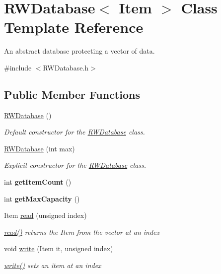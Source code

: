 \hypertarget{class_r_w_database}{}\section{R\+W\+Database$<$ Item $>$ Class Template Reference}
\label{class_r_w_database}


An abstract database protecting a vector of data.  




{\ttfamily \#include $<$R\+W\+Database.\+h$>$}

\subsection*{Public Member Functions}
\begin{DoxyCompactItemize}
\item 
\hyperlink{class_r_w_database_ab6e78a49fcfe2e296b7d7695c1404dd5}{R\+W\+Database} ()
\begin{DoxyCompactList}\small\item\em Default constructor for the \hyperlink{class_r_w_database}{R\+W\+Database} class. \end{DoxyCompactList}\item 
\hyperlink{class_r_w_database_aed3ea810bc64b4fcb41a8660b3a583de}{R\+W\+Database} (int max)
\begin{DoxyCompactList}\small\item\em Explicit constructor for the \hyperlink{class_r_w_database}{R\+W\+Database} class. \end{DoxyCompactList}\item 
\mbox{\label{class_r_w_database_aa09d7c17e7741dcb480f052ff3689299}} 
int {\bfseries get\+Item\+Count} ()
\item 
\mbox{\label{class_r_w_database_a11a8f38b6a48e2ede789d0ed7081a737}} 
int {\bfseries get\+Max\+Capacity} ()
\item 
Item \hyperlink{class_r_w_database_acb53aad02a38e6e021ba61f63b35ba9a}{read} (unsigned index)
\begin{DoxyCompactList}\small\item\em \hyperlink{class_r_w_database_acb53aad02a38e6e021ba61f63b35ba9a}{read()} returns the Item from the vector at an index \end{DoxyCompactList}\item 
void \hyperlink{class_r_w_database_acfdb85c4ae5201e9997265c6d44a3111}{write} (Item it, unsigned index)
\begin{DoxyCompactList}\small\item\em \hyperlink{class_r_w_database_acfdb85c4ae5201e9997265c6d44a3111}{write()} sets an item at an index \end{DoxyCompactList}\end{DoxyCompactItemize}
